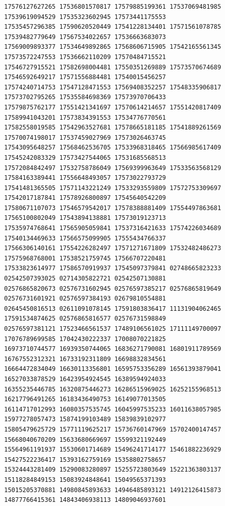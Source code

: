 \documentclass[10pt]{article}
\begin{document}
\begin{verbatim}
17576127627265 17536801570817 17579885199361 17537069481985 17539619094529 17535323602945 17573441175553
17535457296385 17590620520449 17541228134401 17571561078785 17539482779649 17567534022657 17536663683073
17569009893377 17534649892865 17568606715905 17542165561345 17573572247553 17536662110209 17570484715521
17546727915521 17582698004481 17550351269889 17573570674689 17546592649217 17571556884481 17540015456257
17574240714753 17547128471553 17569408352257 17548335906817 17573702795265 17535584698369 17573970706433
17579875762177 17551421341697 17570614214657 17551420817409 17589941043201 17573834391553 17534776770561
17582558019585 17542963527681 17578665181185 17541889261569 17570074198017 17537459027969 17573026463745
17543095648257 17568462536705 17533968318465 17566985617409 17545242083329 17573427544065 17531685568513
17572084842497 17532758786049 17569399963649 17533563568129 17584163389441 17556648493057 17573022793729
17541481365505 17571143221249 17533293559809 17572753309697 17542017187841 17578926800897 17545640542209
17580671107073 17546579542017 17578388881409 17554497863681 17565100802049 17543894138881 17573019123713
17535974768641 17565905059841 17537316421633 17574226034689 17540134469633 17566575099905 17555434766337
17566306140161 17554226282497 17571271671809 17532482486273 17575968768001 17538521759745 17566707220481
17533823614977 17586570919937 17545097379841 02748665823233 02542507393025 02714305822721 02542507130881
02576865820673 02576731602945 02576597385217 02576865819649 02576731601921 02576597384193 02679810554881
02645450816513 02611091078145 17591803836417 11131904062465 17591534874625 02576865816577 02576731598849
02576597381121 17523466561537 17489106561025 17111149700097 17076789699585 17042430222337 17008070221825
16973710744577 16939350744065 16836271790081 16801911789569 16767552312321 16733192311809 16698832834561
16664472834049 16630113356801 16595753356289 16561393879041 16527033878529 16423954924545 16389594924033
16355235446785 16320875446273 16286515969025 16252155968513 16217796491265 16183436490753 16149077013505
16114717012993 16080357535745 16045997535233 16011638057985 15977278057473 15874199103489 15839839102977
15805479625729 15771119625217 15736760147969 15702400147457 15668040670209 15633680669697 15599321192449
15564961191937 15530601714689 15496241714177 15461882236929 15427522236417 15393162759169 15358802758657
15324443281409 15290083280897 15255723803649 15221363803137 15118284849153 15083924848641 15049565371393
15015205370881 14980845893633 14946485893121 14912126415873 14877766415361 14843406938113 14809046937601

\end{verbatim}
\end{document}
